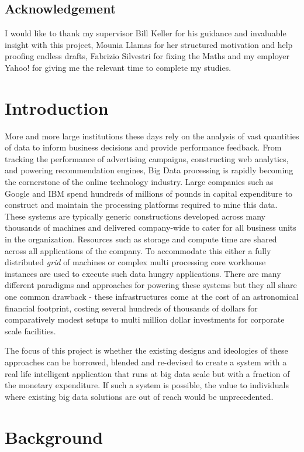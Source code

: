 \documentclass[a4paper,11pt]{scrreprt}
\begin{document}
\section*{Acknowledgement}
I would like to thank my supervisor Bill Keller for his guidance and invaluable insight with this project, Mounia Llamas for her structured motivation and help proofing endless drafts, Fabrizio Silvestri for fixing the Maths and my employer Yahoo! for giving me the relevant time to complete my studies.


\tableofcontents

\chapter{Introduction}
More and more large institutions these days rely on the analysis of vast quantities of data to inform business decisions and provide performance feedback. From tracking the performance of advertising campaigns, constructing web analytics, and powering recommendation engines, Big Data processing is rapidly becoming the cornerstone of the online technology industry. Large companies such as Google and IBM spend hundreds of millions of pounds in capital expenditure to construct and maintain the processing platforms required to mine this data. These systems are typically generic constructions developed across many thousands of machines and delivered company-wide to cater for all business units in the organization. Resources such as storage and compute time are shared across all applications of the company. To accommodate this either a fully distributed \textit{grid} of machines or complex multi processing core workhouse instances are used to execute such data hungry applications. There are many different paradigms and approaches for powering these systems but they all share one common drawback - these infrastructures come at the cost of an astronomical financial footprint, costing several hundreds of thousands of dollars for comparatively modest setups to multi million dollar investments for corporate scale facilities.

The focus of this project is whether the existing designs and ideologies of these approaches can be borrowed, blended and re-devised to create a system with a real life intelligent application that runs at big data scale but with a fraction of the monetary expenditure. If such a system is possible, the value to individuals where existing big data solutions are out of reach would be unprecedented.

\chapter{Background}
\end{document}
